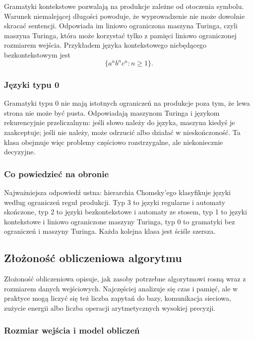 Gramatyki kontekstowe pozwalają na produkcje zależne od otoczenia symbolu. Warunek niemalejącej długości powoduje, że wyprowadzenie nie może dowolnie skracać sentencji. Odpowiada im liniowo ograniczona maszyna Turinga, czyli maszyna Turinga, która może korzystać tylko z pamięci liniowo ograniczonej rozmiarem wejścia. Przykładem języka kontekstowego niebędącego bezkontekstowym jest
\[
\{a^n b^n c^n:n\ge 1\}.
\]

\subsubsection{Języki typu 0}

Gramatyki typu 0 nie mają istotnych ograniczeń na produkcje poza tym, że lewa strona nie może być pusta. Odpowiadają maszynom Turinga i językom rekurencyjnie przeliczalnym: jeśli słowo należy do języka, maszyna kiedyś je zaakceptuje; jeśli nie należy, może odrzucić albo działać w nieskończoność. Ta klasa obejmuje więc problemy częściowo rozstrzygalne, ale niekoniecznie decyzyjne.

\subsubsection{Co powiedzieć na obronie}

Najważniejsza odpowiedź ustna: hierarchia Chomsky'ego klasyfikuje języki według ograniczeń reguł produkcji. Typ 3 to języki regularne i automaty skończone, typ 2 to języki bezkontekstowe i automaty ze stosem, typ 1 to języki kontekstowe i liniowo ograniczone maszyny Turinga, typ 0 to gramatyki bez ograniczeń i maszyny Turinga. Każda kolejna klasa jest ściśle szersza.

\subsection{Złożoność obliczeniowa algorytmu}

Złożoność obliczeniowa opisuje, jak zasoby potrzebne algorytmowi rosną wraz z rozmiarem danych wejściowych. Najczęściej analizuje się czas i pamięć, ale w praktyce mogą liczyć się też liczba zapytań do bazy, komunikacja sieciowa, zużycie energii albo liczba operacji arytmetycznych wysokiej precyzji.

\subsubsection{Rozmiar wejścia i model obliczeń}


